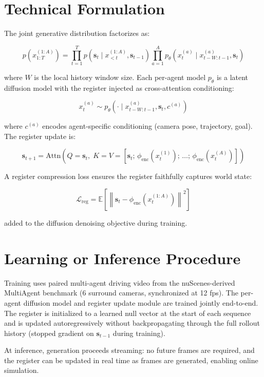 \documentclass[10pt,twocolumn]{article}
\begin{document}
\section{Technical Formulation}

The joint generative distribution factorizes as:

\[
p\!\left(x^{(1:A)}_{1:T}\right)
  = \prod_{t=1}^T
    p\!\left(\mathbf{s}_t \mid x^{(1:A)}_{<t}, \mathbf{s}_{t-1}\right)
    \prod_{a=1}^A
    p_\theta\!\left(x^{(a)}_t \mid x^{(a)}_{t-W:t-1}, \mathbf{s}_t\right)
\]

where $W$ is the local history window size. Each per-agent model
$p_\theta$ is a latent diffusion model with the register injected
as cross-attention conditioning:

\[
x^{(a)}_t \sim p_\theta\!\left(\cdot \mid x^{(a)}_{t-W:t-1}, \mathbf{s}_t, c^{(a)}\right)
\]

where $c^{(a)}$ encodes agent-specific conditioning (camera pose,
trajectory, goal). The register update is:

\[
\mathbf{s}_{t+1}
  = \mathrm{Attn}\!\left(Q = \mathbf{s}_t,\;
  K = V = [\mathbf{s}_t;\, \phi_\mathrm{enc}(x^{(1)}_t);\, \ldots;\,
  \phi_\mathrm{enc}(x^{(A)}_t)]\right)
\]

A register compression loss ensures the register faithfully captures
world state:

\[
\mathcal{L}_\mathrm{reg}
  = \mathbb{E}\!\left[\left\|
    \mathbf{s}_t - \phi_\mathrm{enc}\!\left(x^{(1:A)}_t\right)
  \right\|^2\right]
\]

added to the diffusion denoising objective during training.

\section{Learning or Inference Procedure}

Training uses paired multi-agent driving video from the nuScenes-derived
MultiAgent benchmark (6 surround cameras, synchronized at 12 fps).
The per-agent diffusion model and register update module are trained
jointly end-to-end. The register is initialized to a learned null vector
at the start of each sequence and is updated autoregressively without
backpropagating through the full rollout history (stopped gradient
on $\mathbf{s}_{t-1}$ during training).

At inference, generation proceeds streaming: no future frames are
required, and the register can be updated in real time as frames are
generated, enabling online simulation.
\end{document}
